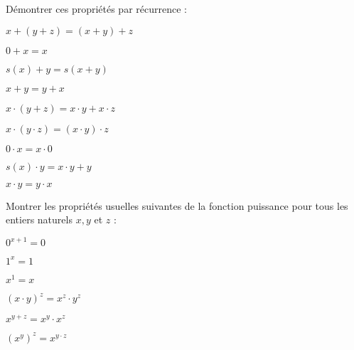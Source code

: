 \documentclass[french]{report}
\begin{document}
\begin{exo}
    Démontrer ces propriétés par récurrence :
    \begin{q}{1}
        \(x+(y+z)=(x+y)+z\)
    \end{q}
    \begin{q}{2}
        \(0+x=x\)
    \end{q}
    \begin{q}{3}
        \(s(x)+y=s(x+y)\)
    \end{q}
    \begin{q}{4}
        \(x+y=y+x\)
    \end{q}
    \begin{q}{5}
        \(x\cdot(y+z)=x\cdot y+x\cdot z\)
    \end{q}
    \begin{q}{6}
        \(x\cdot(y\cdot z)=(x\cdot y)\cdot z\)
    \end{q}
    \begin{q}{7}
        \(0\cdot x=x\cdot0\)
    \end{q}
    \begin{q}{8}
        \(s(x)\cdot y=x\cdot y+y\)
    \end{q}
    \begin{q}{9}
        \(x\cdot y=y\cdot x\)
    \end{q}
\end{exo}

\begin{exo}
    Montrer les propriétés usuelles suivantes de la fonction puissance pour tous les
    entiers naturels \(x,y\) et \(z\) :
    \begin{q}{1}
        \(0^{x+1}=0\)
    \end{q}
    \begin{q}{2}
        \(1^x=1\)
    \end{q}
    \begin{q}{3}
        \(x^1=x\)
    \end{q}
    \begin{q}{4}
        \(\left(x\cdot y\right)^z=x^z\cdot y^z\)
    \end{q}
    \begin{q}{5}
        \(x^{y+z}=x^y\cdot x^z\)
    \end{q}
    \begin{q}{6}
        \(\left(x^y\right)^z=x^{y\cdot z}\)
    \end{q}
\end{exo}
\end{document}
